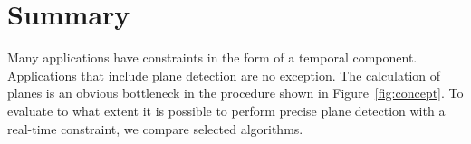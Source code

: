 \documentclass[main.tex]{subfiles}
\begin{document}
\section{Summary}
Many applications have constraints in the form of a temporal component. Applications that include plane detection
are no exception. The calculation of planes is an obvious bottleneck in the procedure shown in Figure~\ref{fig:concept}.
To evaluate to what extent it is possible to perform precise plane detection with a real-time constraint,
we compare selected algorithms.
\end{document}
